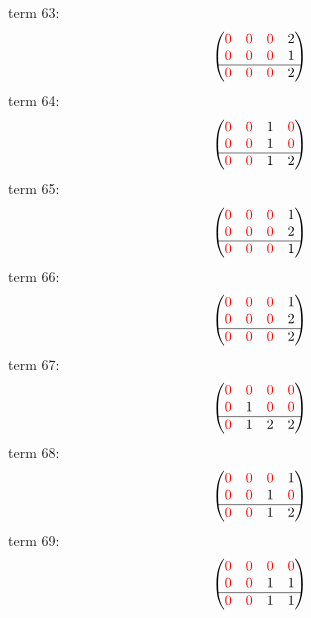 \documentclass{article}
\begin{document}
term 63:
$$\begin{pmatrix}{\color{red} 0} & {\color{red} 0} & {\color{red} 0} & 2\\
{\color{red} 0} & {\color{red} 0} & {\color{red} 0} & 1\\
\hline{\color{red} 0} & {\color{red} 0} & {\color{red} 0} & 2\\
\end{pmatrix}$$
term 64:
$$\begin{pmatrix}{\color{red} 0} & {\color{red} 0} & 1 & {\color{red} 0}\\
{\color{red} 0} & {\color{red} 0} & 1 & {\color{red} 0}\\
\hline{\color{red} 0} & {\color{red} 0} & 1 & 2\\
\end{pmatrix}$$
term 65:
$$\begin{pmatrix}{\color{red} 0} & {\color{red} 0} & {\color{red} 0} & 1\\
{\color{red} 0} & {\color{red} 0} & {\color{red} 0} & 2\\
\hline{\color{red} 0} & {\color{red} 0} & {\color{red} 0} & 1\\
\end{pmatrix}$$
term 66:
$$\begin{pmatrix}{\color{red} 0} & {\color{red} 0} & {\color{red} 0} & 1\\
{\color{red} 0} & {\color{red} 0} & {\color{red} 0} & 2\\
\hline{\color{red} 0} & {\color{red} 0} & {\color{red} 0} & 2\\
\end{pmatrix}$$
term 67:
$$\begin{pmatrix}{\color{red} 0} & {\color{red} 0} & {\color{red} 0} & {\color{red} 0}\\
{\color{red} 0} & 1 & {\color{red} 0} & {\color{red} 0}\\
\hline{\color{red} 0} & 1 & 2 & 2\\
\end{pmatrix}$$
term 68:
$$\begin{pmatrix}{\color{red} 0} & {\color{red} 0} & {\color{red} 0} & 1\\
{\color{red} 0} & {\color{red} 0} & 1 & {\color{red} 0}\\
\hline{\color{red} 0} & {\color{red} 0} & 1 & 2\\
\end{pmatrix}$$
term 69:
$$\begin{pmatrix}{\color{red} 0} & {\color{red} 0} & {\color{red} 0} & {\color{red} 0}\\
{\color{red} 0} & {\color{red} 0} & 1 & 1\\
\hline{\color{red} 0} & {\color{red} 0} & 1 & 1\\
\end{pmatrix}$$
\end{document}

